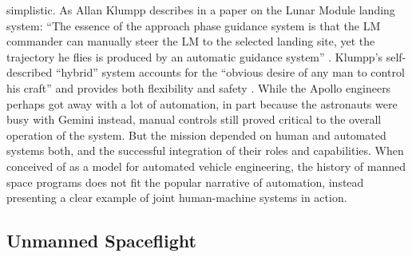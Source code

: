 simplistic. As Allan Klumpp describes in a
paper on the Lunar Module landing system: ``The essence of the
approach phase guidance system is that the LM commander can manually
steer the LM to the selected landing site, yet the trajectory he flies
is produced by an automatic guidance system'' \cite[p. 129]{Klumpp}.
Klumpp's self-described ``hybrid'' system accounts
for the ``obvious desire of any man to control his craft'' and
provides both flexibility and safety \cite[p. 129-130]{Klumpp}.
While the Apollo engineers perhaps
got away with a lot of automation, in part because the astronauts were
busy with Gemini instead, manual controls still proved critical to the
overall operation of the system. But the mission depended on human and
automated systems both, and the successful integration of their roles
and capabilities. When conceived of as a model for automated vehicle
engineering, the history of manned space programs does not fit the
popular narrative of automation, instead presenting a clear example of
joint human-machine systems in action.

\subsection{Unmanned Spaceflight}

